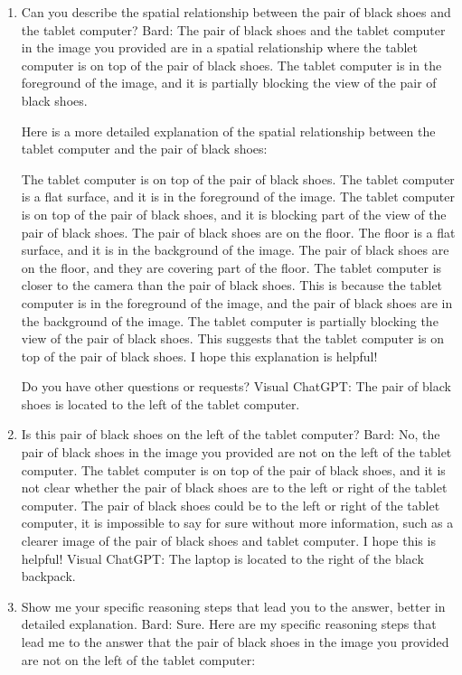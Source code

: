 \begin{enumerate}
    \item Can you describe the spatial relationship between the pair of black shoes and the tablet computer?
    \subitem Bard: The pair of black shoes and the tablet computer in the image you provided are in a spatial relationship where the tablet computer is on top of the pair of black shoes. The tablet computer is in the foreground of the image, and it is partially blocking the view of the pair of black shoes.

    Here is a more detailed explanation of the spatial relationship between the tablet computer and the pair of black shoes:
    
    The tablet computer is on top of the pair of black shoes. The tablet computer is a flat surface, and it is in the foreground of the image. The tablet computer is on top of the pair of black shoes, and it is blocking part of the view of the pair of black shoes.
    The pair of black shoes are on the floor. The floor is a flat surface, and it is in the background of the image. The pair of black shoes are on the floor, and they are covering part of the floor.
    The tablet computer is closer to the camera than the pair of black shoes. This is because the tablet computer is in the foreground of the image, and the pair of black shoes are in the background of the image.
    The tablet computer is partially blocking the view of the pair of black shoes. This suggests that the tablet computer is on top of the pair of black shoes.
    I hope this explanation is helpful!
    
    Do you have other questions or requests?
    \subitem Visual ChatGPT: The pair of black shoes is located to the left of the tablet computer.
    \item Is this pair of black shoes on the left of the tablet computer?
    \subitem Bard: 
    No, the pair of black shoes in the image you provided are not on the left of the tablet computer. The tablet computer is on top of the pair of black shoes, and it is not clear whether the pair of black shoes are to the left or right of the tablet computer.
    The pair of black shoes could be to the left or right of the tablet computer, it is impossible to say for sure without more information, such as a clearer image of the pair of black shoes and tablet computer.
    I hope this is helpful! 
    \subitem Visual ChatGPT: The laptop is located to the right of the black backpack.
    \item Show me your specific reasoning steps that lead you to the answer, better in detailed explanation.
    \subitem Bard: Sure. Here are my specific reasoning steps that lead me to the answer that the pair of black shoes in the image you provided are not on the left of the tablet computer:


\end{enumerate}
